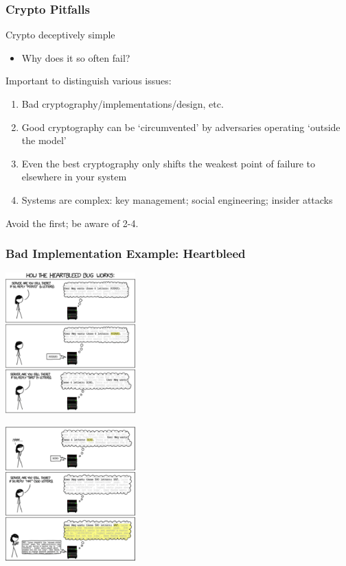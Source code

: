 \begin{frame}\frametitle{Crypto Pitfalls}
Crypto deceptively simple
\begin{itemize}
\item Why does it so often fail?
\end{itemize}
Important to distinguish various issues:
\begin{enumerate}
\item Bad cryptography/implementations/design, etc.
\item Good cryptography can be `circumvented' by adversaries operating `outside the model'
\item Even the best cryptography only shifts the weakest point of failure to elsewhere in your system
\item Systems are complex: key management; social engineering; insider attacks
\end{enumerate}
Avoid the first; be aware of 2-4.
\end{frame}
\begin{frame}\frametitle{Bad Implementation Example: Heartbleed}
  \begin{minipage}[t]{0.49\linewidth} 
    \centering 
    \includegraphics[width=50mm]{pic/heartbleed1} 
  \end{minipage}%
  \begin{minipage}[t]{0.49\linewidth} 
    \centering 
    \includegraphics[width=50mm]{pic/heartbleed2} 
  \end{minipage}
\end{frame}
